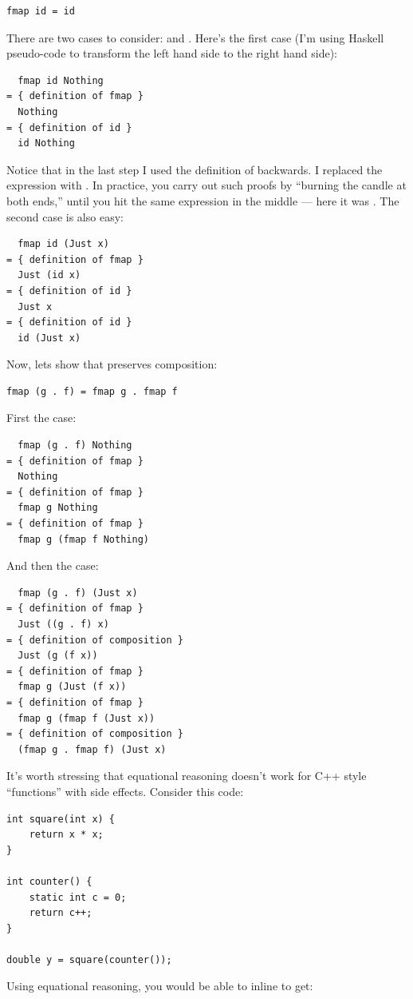 \begin{Verbatim}[commandchars=\\\{\}]
fmap id = id
\end{Verbatim}
There are two cases to consider:  and .
Here's the first case (I'm using Haskell pseudo-code to transform the
left hand side to the right hand side):

\begin{Verbatim}
  fmap id Nothing
= { definition of fmap }
  Nothing
= { definition of id } 
  id Nothing
\end{Verbatim}
Notice that in the last step I used the definition of 
backwards. I replaced the expression  with
. In practice, you carry out such proofs by
``burning the candle at both ends,'' until you hit the same expression
in the middle --- here it was . The second case is also
easy:

\begin{Verbatim}
  fmap id (Just x)
= { definition of fmap }
  Just (id x)
= { definition of id }
  Just x
= { definition of id }
  id (Just x)
\end{Verbatim}
Now, lets show that  preserves composition:

\begin{Verbatim}[commandchars=\\\{\}]
fmap (g . f) = fmap g . fmap f
\end{Verbatim}
First the  case:

\begin{Verbatim}
  fmap (g . f) Nothing
= { definition of fmap }
  Nothing
= { definition of fmap }
  fmap g Nothing
= { definition of fmap }
  fmap g (fmap f Nothing)
\end{Verbatim}
And then the  case:

\begin{Verbatim}
  fmap (g . f) (Just x)
= { definition of fmap }
  Just ((g . f) x)
= { definition of composition }
  Just (g (f x))
= { definition of fmap }
  fmap g (Just (f x))
= { definition of fmap }
  fmap g (fmap f (Just x))
= { definition of composition }
  (fmap g . fmap f) (Just x)
\end{Verbatim}
It's worth stressing that equational reasoning doesn't work for C++
style ``functions'' with side effects. Consider this code:

\begin{Verbatim}
int square(int x) { 
    return x * x;
}

int counter() { 
    static int c = 0;
    return c++;
}

double y = square(counter());
\end{Verbatim}
Using equational reasoning, you would be able to inline 
to get:

